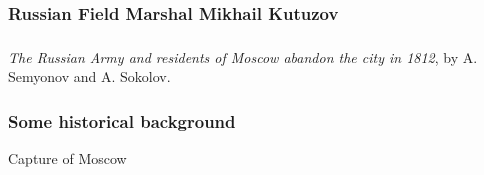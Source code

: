 \documentclass[12pt]{beamer}\usepackage[]{graphicx}\usepackage[]{color}
\begin{document}

\begin{frame}
\frametitle{Russian Field Marshal Mikhail Kutuzov}
\begin{center}
\end{center}
\end{frame}


{ %
    \begin{frame}[plain]
     \end{frame}
}


\begin{frame}
\frametitle{}
\begin{center}

{\tiny {\lolit \textit{The Russian Army and residents of Moscow abandon the city in 1812}, by A. Semyonov and A. Sokolov.}}
\end{center}
\end{frame}


\begin{frame}
\frametitle{Some historical background}

{\Large Capture of Moscow}

\vspace{1cm}

{\Large {}}

\vspace{1cm}

{\Large {}}

\end{frame}
\end{document}
